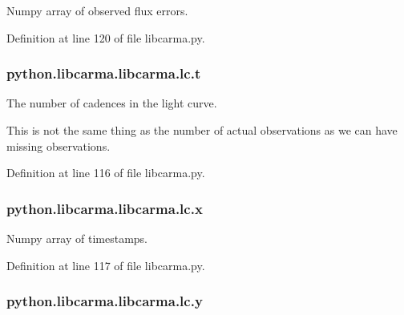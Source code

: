 Numpy array of observed flux errors. 



Definition at line 120 of file libcarma.\-py.

\hypertarget{classpython_1_1libcarma_1_1libcarma_1_1lc_ae93b27478fd4ad5c8ee58d8764fe2211}{
\subsubsection[{t}]{\setlength{\rightskip}{0pt plus 5cm}python.\-libcarma.\-libcarma.\-lc.\-t}}\label{classpython_1_1libcarma_1_1libcarma_1_1lc_ae93b27478fd4ad5c8ee58d8764fe2211}


The number of cadences in the light curve. 

This is not the same thing as the number of actual observations as we can have missing observations. 

Definition at line 116 of file libcarma.\-py.

\hypertarget{classpython_1_1libcarma_1_1libcarma_1_1lc_a94316ed54be0afdbd7e67f2d56ad43dc}{
\subsubsection[{x}]{\setlength{\rightskip}{0pt plus 5cm}python.\-libcarma.\-libcarma.\-lc.\-x}}\label{classpython_1_1libcarma_1_1libcarma_1_1lc_a94316ed54be0afdbd7e67f2d56ad43dc}


Numpy array of timestamps. 



Definition at line 117 of file libcarma.\-py.

\hypertarget{classpython_1_1libcarma_1_1libcarma_1_1lc_ab4f0a7ce4a5aea2d190f61acfeb072a3}{
\subsubsection[{y}]{\setlength{\rightskip}{0pt plus 5cm}python.\-libcarma.\-libcarma.\-lc.\-y}}\label{classpython_1_1libcarma_1_1libcarma_1_1lc_ab4f0a7ce4a5aea2d190f61acfeb072a3}


